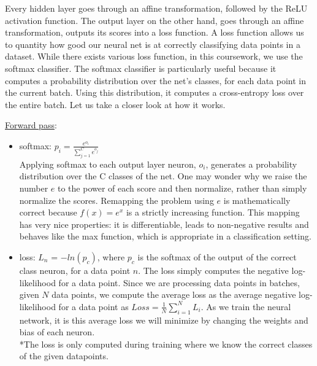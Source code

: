 
Every hidden layer goes through an affine transformation, followed by the ReLU activation function.
The output layer on the other hand,  goes through an affine transformation, outputs its scores into a loss function.
A loss function allows us to quantity how good our neural net is at correctly classifying data points in a dataset.
While there exists various loss function, in this coursework, we use the softmax classifier.
The softmax classifier is particularly useful because it computes a probability distribution over the net's classes, for each data point in the current batch.
Using this distribution, it computes a cross-entropy loss over the entire batch.
Let us take a closer look at how it works.

\underline{Forward pass}:

\begin{itemize}[topsep=-10pt]
   \item softmax: $p_i = \frac{e^{o_i}}{\sum_{j=1}^{C} e^{o_j}}$\\
     Applying softmax to each output layer neuron, $o_i$, generates a probability distribution over the C classes of the net.
     One may wonder why we raise the number $e$ to the power of each score and then normalize,
     rather than simply normalize the scores. Remapping the problem using $e$ is mathematically correct because
     $f(x) = e^x$ is a strictly increasing function.
     This mapping has very nice properties: it is differentiable, leads to non-negative results and behaves like the max function,
     which is appropriate in a classification setting.
     
   \item loss: $L_n$ = $-ln(p_c)$, where $p_c$ is the softmax of the output of the correct class neuron, for a data point $n$.
     The loss simply computes the negative log-likelihood for a data point.
     Since we are processing data points in batches, given $N$ data points,
     we compute the average loss as the average negative log-likelihood for a data point as $Loss = \frac{1}{N}\sum_{i=1}^{N}L_i$.
     As we train the neural network, it is this average loss we will minimize by changing the weights and bias of each neuron.\\
     *The loss is only computed during training where we know the correct classes of the given datapoints.
     
     
\end{itemize}

